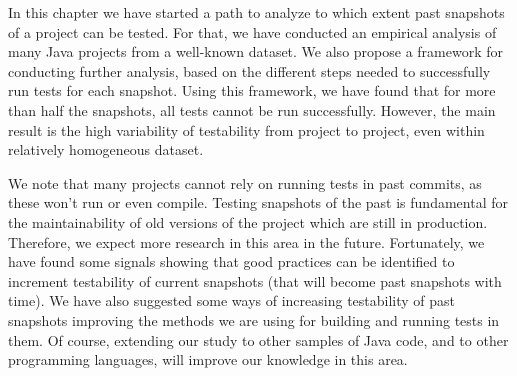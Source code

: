 In this chapter we have started a path to analyze to which extent past snapshots of a project can be tested. 
For that, we have conducted an empirical analysis of many Java projects from a well-known dataset. 
We also propose a framework for conducting further analysis, based on the different steps needed to successfully run tests for each snapshot. 
Using this framework, we have found that for more than half the snapshots, all tests cannot be run successfully.
However, the main result is the high variability of testability from project to project, even within relatively homogeneous dataset. 


We note that many projects cannot rely on running tests in past commits, as these won’t run or even compile.
Testing snapshots of the past is fundamental for the maintainability of old versions of the project which are still in production. 
Therefore, we expect more research in this area in the future. 
Fortunately, we have found some signals showing that good practices can be identified to increment testability of current snapshots (that will become past snapshots with time). 
We have also suggested some ways of increasing testability of past snapshots improving the methods we are using for building and running tests in them. 
Of course, extending our study to other samples of Java code, and to other programming languages, will improve our knowledge in this area.

